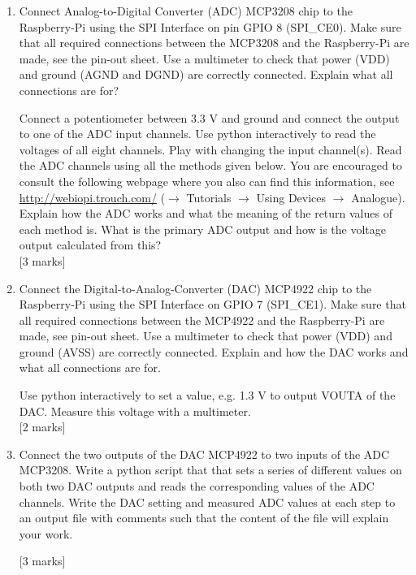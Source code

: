 \begin{enumerate}

\item [2.1.]	 Connect Analog-to-Digital Converter (ADC) MCP3208 chip to the Raspberry-Pi using the SPI Interface on pin GPIO 8 (SPI\_CE0). Make sure that all required connections between the MCP3208 and the Raspberry-Pi are made, see the pin-out sheet. Use a multimeter to check that power (VDD) and ground (AGND and DGND) are correctly connected. Explain what all connections are for?

Connect a potentiometer between 3.3 V and ground and connect the output to one of the ADC input channels.  Use python interactively to read the voltages of all eight channels. Play with changing the input channel(s).  Read the ADC channels using all the methods given below. You are encouraged to consult the following webpage where you also can find this information, see \url{http://webiopi.trouch.com/} ($\rightarrow$ Tutorials $\rightarrow$ Using Devices $\rightarrow$ Analogue). Explain how the ADC works and what the meaning of the return values of each method is. What is the primary ADC output and how is the voltage output calculated from this? \\


\hfill [3 marks]\\

\newpage
\item [2.2.]	 Connect the Digital-to-Analog-Converter (DAC) MCP4922 chip to the Raspberry-Pi using the SPI Interface on GPIO 7 (SPI\_CE1). Make sure that all required connections between the MCP4922 and the Raspberry-Pi are made, see pin-out sheet. Use a multimeter to check that power (VDD) and ground (AVSS) are correctly connected. Explain and how the DAC works and what all connections are for. 

Use python interactively to set a value, e.g. 1.3 V to output VOUTA of the DAC. Measure this voltage with a multimeter. \\


\hfill [2 marks]\\

\item [2.3.] Connect the two outputs of the DAC MCP4922 to two inputs of the ADC MCP3208. Write a python script that that sets a series of different values on both two DAC outputs and reads the corresponding values of the ADC channels.  Write the DAC setting and measured ADC values at each step to an output file with comments such that the content of the file will explain your work.  

\hfill [3 marks]\\

\end{enumerate}



